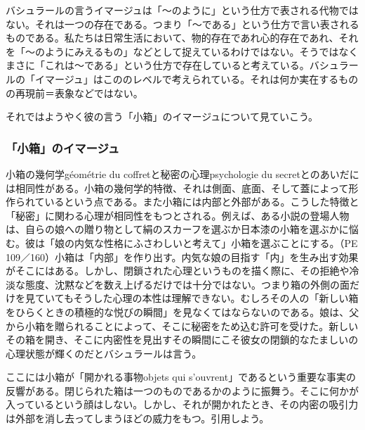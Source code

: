 \documentclass[b5j,twoside,twocolumn]{utarticle}
\begin{document}
バシュラールの言うイマージュは「～のように」という仕方で表される代物ではない。それは一つの存在である。つまり「～である」という仕方で言い表されるものである。私たちは日常生活において、物的存在であれ心的存在であれ、それを「～のようにみえるもの」などとして捉えているわけではない。そうではなくまさに「これは～である」という仕方で存在していると考えている。バシュラールの「イマージュ」はこののレベルで考えられている。それは何か実在するものの再現前＝表象などではない。


それではようやく彼の言う「小箱」のイマージュについて見ていこう。
\subsubsection{「小箱」のイマージュ}
小箱の幾何学géométrie du coffretと秘密の心理psychologie du secretとのあいだには相同性がある。小箱の幾何学的特徴、それは側面、底面、そして蓋によって形作られているという点である。また小箱には内部と外部がある。こうした特徴と「秘密」に関わる心理が相同性をもつとされる。例えば、ある小説の登場人物は、自らの娘への贈り物として絹のスカーフを選ぶか日本漆の小箱を選ぶかに悩む。彼は「娘の内気な性格にふさわしいと考えて」小箱を選ぶことにする。（PE 109／160）小箱は「内部」を作り出す。内気な娘の目指す「内」を生み出す効果がそこにはある。しかし、閉鎖された心理というものを描く際に、その拒絶や冷淡な態度、沈黙などを数え上げるだけでは十分ではない。つまり箱の外側の面だけを見ていてもそうした心理の本性は理解できない。むしろその人の「新しい箱をひらくときの積極的な悦びの瞬間」を見なくてはならないのである。娘は、父から小箱を贈られることによって、そこに秘密をため込む許可を受けた。新しいその箱を開き、そこに内密性を見出すその瞬間にこそ彼女の閉鎖的なたましいの心理状態が輝くのだとバシュラールは言う。


ここには小箱が「開かれる事物objets qui s'ouvrent」であるという重要な事実の反響がある。閉じられた箱は一つのものであるかのように振舞う。そこに何かが入っているという顔はしない。しかし、それが開かれたとき、その内密の吸引力は外部を消し去ってしまうほどの威力をもつ。引用しよう。
\end{document}
